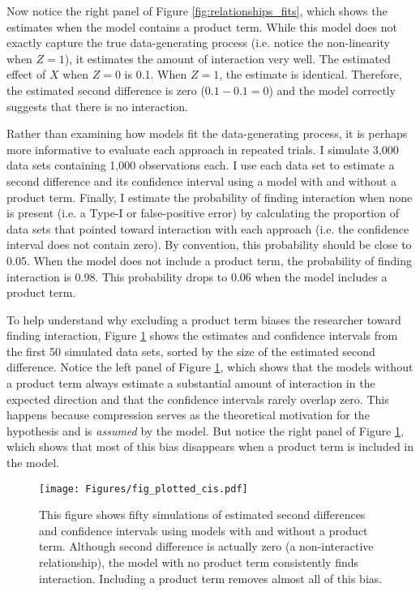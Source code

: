 \documentclass[12pt]{article}
\begin{document}
Now notice the right panel of Figure \ref{fig:relationships_fits}, which shows the estimates when the model contains a product term. While this model does not exactly capture the true data-generating process (i.e. notice the non-linearity when $Z = 1$), it estimates the amount of interaction very well. The estimated effect of $X$ when $Z=0$  is 0.1. When $Z = 1$, the estimate is identical. Therefore, the estimated second difference is zero ($0.1 - 0.1 = 0$) and the model correctly suggests that there is no interaction.

Rather than examining how models fit the data-generating process, it is perhaps more informative to evaluate each approach in repeated trials. I simulate 3,000 data sets containing 1,000 observations each. I use each data set to estimate a second difference and its confidence interval using a model with and without a product term. Finally, I estimate the probability of finding interaction when none is present (i.e. a Type-I or false-positive error) by calculating the proportion of data sets that pointed toward interaction with each approach (i.e. the confidence interval does not contain zero). By convention, this probability should be close to 0.05. When the model does not include a product term, the probability of finding interaction is 0.98. This probability  drops to 0.06 when the model includes a product term. 

To help understand why excluding a product term biases the researcher toward finding interaction, Figure \ref{fig:plotted_cis} shows the estimates and confidence intervals from the first 50 simulated data sets, sorted by the size of the estimated second difference. Notice the left panel of Figure \ref{fig:plotted_cis}, which shows that the models without a product term always estimate a substantial amount of interaction in the expected direction  and that the confidence intervals rarely overlap zero. This happens because compression serves as the theoretical motivation for the hypothesis and is \textit{assumed} by the model. But notice the right panel of Figure \ref{fig:plotted_cis}, which shows that most of this bias disappears when a product term is included in the model.

\begin{figure}[h]
\begin{center}
\texttt{[image: Figures/fig\_plotted\_cis.pdf]}
\end{center}
\caption{This figure shows fifty simulations of estimated second differences and confidence intervals using models with and without a product term. Although second difference is actually zero (a non-interactive relationship), the model with no product term consistently finds interaction. Including a product term removes almost all of this bias.}\label{fig:plotted_cis}
\end{figure}
\end{document}
